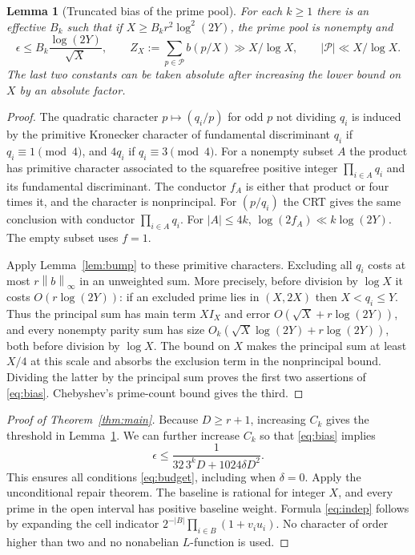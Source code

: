 \documentclass[11pt]{article}
\newtheorem{lemma}[theorem]{Lemma}
\theoremstyle{remark}\newtheorem{remark}[theorem]{Remark}
\newcommand{\Pp}{\mathcal P}
\newcommand{\norm}[1]{\left\|#1\right\|}
\begin{document}
\begin{lemma}[Truncated bias of the prime pool]\label{lem:primebias}
For each $k\ge1$ there is an effective $B_k$ such that if $X\ge B_k r^2\log^2(2Y)$, the prime pool is nonempty and
\begin{equation}\label{eq:bias}
 \epsilon\le B_k\frac{\log(2Y)}{\sqrt X},\qquad
 Z_X:=\sum_{p\in\Pp}b(p/X)\gg X/\log X,\qquad |\Pp|\ll X/\log X.
\end{equation}
The last two constants can be taken absolute after increasing the lower bound on $X$ by an absolute factor.
\end{lemma}
\begin{proof}
The quadratic character $p\mapsto(q_i/p)$ for odd $p$ not dividing $q_i$ is induced by the primitive Kronecker character of fundamental discriminant $q_i$ if $q_i\equiv1\pmod4$, and $4q_i$ if $q_i\equiv3\pmod4$. For a nonempty subset $A$ the product has primitive character associated to the squarefree positive integer $\prod_{i\in A}q_i$ and its fundamental discriminant. The conductor $f_A$ is either that product or four times it, and the character is nonprincipal. For $(p/q_i)$ the CRT gives the same conclusion with conductor $\prod_{i\in A}q_i$. For $|A|\le4k$, $\log(2f_A)\ll k\log(2Y)$. The empty subset uses $f=1$.

Apply Lemma~\ref{lem:bump} to these primitive characters. Excluding all $q_i$ costs at most $r\norm b_\infty$ in an unweighted sum. More precisely, before division by $\log X$ it costs $O(r\log(2Y))$: if an excluded prime lies in $(X,2X)$ then $X<q_i\le Y$. Thus the principal sum has main term $XI_X$ and error $O(\sqrt X+r\log(2Y))$, and every nonempty parity sum has size $O_k(\sqrt X\log(2Y)+r\log(2Y))$, both before division by $\log X$. The bound on $X$ makes the principal sum at least $X/4$ at this scale and absorbs the exclusion term in the nonprincipal bound. Dividing the latter by the principal sum proves the first two assertions of \eqref{eq:bias}. Chebyshev's prime-count bound gives the third.
\end{proof}
\begin{proof}[Proof of Theorem~\ref{thm:main}]
Because $D\ge r+1$, increasing $C_k$ gives the threshold in Lemma~\ref{lem:primebias}. We can further increase $C_k$ so that \eqref{eq:bias} implies
\[
 \epsilon\le \frac{1}{32\,3^kD+1024\delta D^2}.
\]
This ensures all conditions \eqref{eq:budget}, including when $\delta=0$. Apply the unconditional repair theorem. The baseline is rational for integer $X$, and every prime in the open interval has positive baseline weight. Formula \eqref{eq:indep} follows by expanding the cell indicator $2^{-|B|}\prod_{i\in B}(1+v_i u_i)$. No character of order higher than two and no nonabelian $L$-function is used.
\end{proof}
\end{document}
